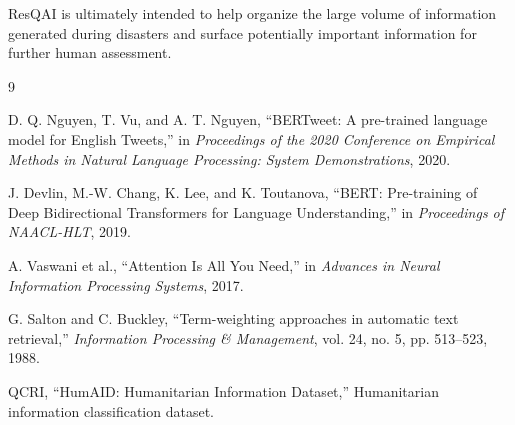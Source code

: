 \documentclass[12pt,a4paper]{article}
\begin{document}
ResQAI is ultimately intended to help organize the large volume of
information generated during disasters and surface potentially important
information for further human assessment.

\newpage

\begin{thebibliography}{9}

D. Q. Nguyen, T. Vu, and A. T. Nguyen,
``BERTweet: A pre-trained language model for English Tweets,''
in \textit{Proceedings of the 2020 Conference on Empirical Methods in Natural
Language Processing: System Demonstrations}, 2020.

J. Devlin, M.-W. Chang, K. Lee, and K. Toutanova,
``BERT: Pre-training of Deep Bidirectional Transformers for Language
Understanding,''
in \textit{Proceedings of NAACL-HLT}, 2019.

A. Vaswani et al.,
``Attention Is All You Need,''
in \textit{Advances in Neural Information Processing Systems}, 2017.

G. Salton and C. Buckley,
``Term-weighting approaches in automatic text retrieval,''
\textit{Information Processing \& Management},
vol. 24, no. 5, pp. 513--523, 1988.

QCRI,
``HumAID: Humanitarian Information Dataset,''
Humanitarian information classification dataset.

\end{thebibliography}

\end{document}
